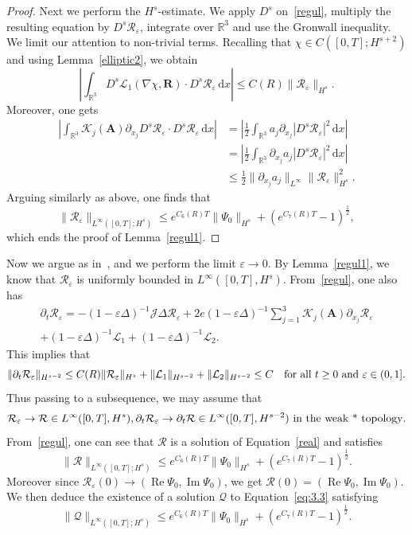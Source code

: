 \documentclass[AHL,Unicode,longabstracts]{cedram}
\newcommand{\BA}{\mathbf{A}}
\newcommand{\BR}{\mathbf{R}}
\newcommand{\R}{\mathbb{R}}
\DeclareMathOperator{\IM}{Im}
\DeclareMathOperator{\RE}{Re}
\newcommand*{\dd}{\mathrm{d}}
\newcommand*{\dx}{\dd x}
\begin{document}
\begin{proof}
Next we perform the $H^s$-estimate. We apply $D^s$ on~\eqref{regul}, multiply the resulting equation by $D^s \mathcal{R}_\varepsilon$, integrate over $\R^3$ and use the Gronwall inequality. We limit our attention to non-trivial terms. Recalling that $\chi \in C([0,T];H^{s+2})$ and using Lemma~\ref{elliptic2}, we obtain
\[
\left| \int_{\R^3} D^s \mathcal{L}_1(\nabla\chi, \BR)
\cdot D^s \mathcal{R}_\varepsilon \,\dx \right| \leq C(R) \| \mathcal{R}_\varepsilon \|_{H^s}.
\]
Moreover, one gets
\begin{align*}
\left| \int_{\R^3} \mathcal{K}_j(\BA) \partial_{x_j}D^s \mathcal{R}_\varepsilon
\cdot D^s \mathcal{R}_\varepsilon \,\dx \right| &= \left| \frac{1}{2} \int_{\R^3} a_j \partial_{x_j} |D^s\mathcal{R}_\varepsilon |^2 \,\dx \right | \\
&= \left| \frac{1}{2} \int_{\R^3} \partial_{x_j} a_j |D^s \mathcal{R}_\varepsilon |^2 \,\dx \right | \nonumber \\
&\leq \frac{1}{2} \| \partial_{x_j}a_j \|_{L^\infty} \| \mathcal{R}_\varepsilon \|_{H^s}^2.
\end{align*}
Arguing similarly as above, one finds that
\[
\| \mathcal{R}_\varepsilon \|_{L^\infty([0,T];H^s)}
\leq e^{C_6(R)T} \| \Psi_0 \|_{H^s} + (e^{C_7(R)T}-1)^{\frac{1}{2}},
\]
which ends the proof of Lemma~\ref{regul1}.
\end{proof}

Now we argue as in~\cite{BDS}, \cite{CG} and we perform the limit $\varepsilon \to 0$. By Lemma~\ref{regul1}, we know that $\mathcal{R}_{\varepsilon}$ is uniformly bounded in $L^{\infty}([0,T],H^s)$. From~\eqref{regul}, one also has
\begin{multline*}
\partial_t \mathcal{R}_{\varepsilon} = -(1-\varepsilon \Delta)^{-1} \mathcal{J} \Delta \mathcal{R}_{\varepsilon} +2e (1-\varepsilon \Delta)^{-1} \sum_{j=1}^3 \mathcal{K}_j(\BA) \partial_{x_j} \mathcal{R}_{\varepsilon} \\
 + (1-\varepsilon \Delta)^{-1} \mathcal{L}_1 + (1-\varepsilon \Delta)^{-1} \mathcal{L}_2.
\end{multline*}
This implies that
\[
\| \partial_t \mathcal{R}_{\varepsilon} \|_{H^{s-2}}
\le C(R) \| \mathcal{R}_{\varepsilon} \|_{H^s} +\| \mathcal{L}_1 \|_{H^{s-2}} + \| \mathcal{L}_2 \|_{H^{s-2}}
\le C \quad \hbox{for all} \ t \ge 0 \ \hbox{and} \ \varepsilon \in (0,1].
\]
Thus passing to a subsequence, we may assume that
\[
\mathcal{R}_{\varepsilon} \to \mathcal{R} \in L^{\infty}([0,T],H^s),
\partial_t \mathcal{R}_{\varepsilon} \to \partial_t \mathcal{R} \in L^{\infty}([0,T],H^{s-2})
\ \hbox{in the weak * topology}.
\]
From~\eqref{regul}, one can see that $\mathcal{R}$ is a solution of Equation~\eqref{real} and satisfies
\[
\| \mathcal{R} \|_{L^\infty([0,T];H^s)} \leq
e^{C_6(R)T} \| \Psi_0 \|_{H^s} + (e^{C_7(R)T}-1)^{\frac{1}{2}}.
\]
Moreover since $\mathcal{R}_{\varepsilon}(0) \to (\RE \Psi_0,\IM\Psi_0)$, we get $\mathcal{R}(0)=(\RE \Psi_0,\IM\Psi_0)$. We then deduce the existence of a solution $\mathcal{Q}$ to Equation~\eqref{eq:3.3} satisfying
\begin{equation}\label{esti1}
\| \mathcal{Q} \|_{L^\infty([0,T];H^s)} \leq e^{C_6(R)T} \| \Psi_0 \|_{H^s} + (e^{C_7(R)T}-1)^{\frac{1}{2}}.
\end{equation}
\end{document}
